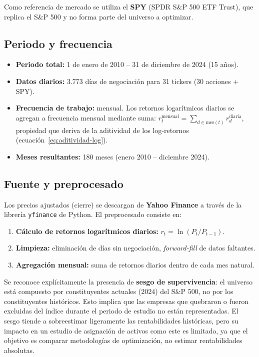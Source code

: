 Como referencia de mercado se utiliza el \textbf{SPY} (SPDR S\&P 500 ETF
Trust), que replica el S\&P 500 y no forma parte del universo a optimizar.

\subsection{Periodo y frecuencia}

\begin{itemize}
    \item \textbf{Periodo total:} 1 de enero de 2010 -- 31 de diciembre de
          2024 (15 años).
    \item \textbf{Datos diarios:} 3.773 días de negociación para 31 tickers
          (30 acciones + SPY).
    \item \textbf{Frecuencia de trabajo:} mensual. Los retornos logarítmicos
          diarios se agregan a frecuencia mensual mediante suma:
          $r_t^{\text{mensual}} = \sum_{d \in \text{mes}(t)} r_d^{\text{diaria}}$,
          propiedad que deriva de la aditividad de los log-retornos
          (ecuación~\ref{eq:aditividad-log}).
    \item \textbf{Meses resultantes:} 180 meses (enero 2010 -- diciembre 2024).
\end{itemize}

\subsection{Fuente y preprocesado}

Los precios ajustados (cierre) se descargan de \textbf{Yahoo Finance} a
través de la librería \texttt{yfinance} de Python. El preprocesado consiste en:

\begin{enumerate}
    \item \textbf{Cálculo de retornos logarítmicos diarios:}
          $r_t = \ln(P_t / P_{t-1})$.
    \item \textbf{Limpieza:} eliminación de días sin negociación,
          \textit{forward-fill} de datos faltantes.
    \item \textbf{Agregación mensual:} suma de retornos diarios dentro de
          cada mes natural.
\end{enumerate}

Se reconoce explícitamente la presencia de \textbf{sesgo de supervivencia}:
el universo está compuesto por constituyentes actuales (2024) del S\&P 500,
no por los constituyentes históricos. Esto implica que las empresas que
quebraron o fueron excluidas del índice durante el periodo de estudio no
están representadas. El sesgo tiende a sobreestimar ligeramente las
rentabilidades históricas, pero su impacto en un estudio de asignación de
activos como este es limitado, ya que el objetivo es comparar metodologías
de optimización, no estimar rentabilidades absolutas.

